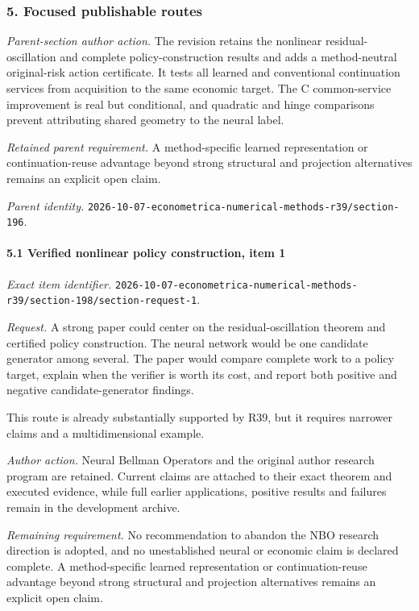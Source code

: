 \subsubsection{5. Focused publishable routes}

\emph{Parent-section author action.} The revision retains the nonlinear residual-oscillation and complete policy-construction results and adds a method-neutral original-risk action certificate. It tests all learned and conventional continuation services from acquisition to the same economic target. The C common-service improvement is real but conditional, and quadratic and hinge comparisons prevent attributing shared geometry to the neural label.

\par\emph{Retained parent requirement.} A method-specific learned representation or continuation-reuse advantage beyond strong structural and projection alternatives remains an explicit open claim.

\par\emph{Parent identity.} \nolinkurl{2026-10-07-econometrica-numerical-methods-r39/section-196}.

\paragraph{5.1 Verified nonlinear policy construction, item 1}

\emph{Exact item identifier.} \nolinkurl{2026-10-07-econometrica-numerical-methods-r39/section-198/section-request-1}.

\par\emph{Request.} A strong paper could center on the residual-oscillation theorem and certified policy construction. The neural network would be one candidate generator among several. The paper would compare complete work to a policy target, explain when the verifier is worth its cost, and report both positive and negative candidate-generator findings.

This route is already substantially supported by R39, but it requires narrower claims and a multidimensional example.

\par\emph{Author action.} Neural Bellman Operators and the original author research program are retained. Current claims are attached to their exact theorem and executed evidence, while full earlier applications, positive results and failures remain in the development archive.

\par\emph{Remaining requirement.} No recommendation to abandon the NBO research direction is adopted, and no unestablished neural or economic claim is declared complete. A method-specific learned representation or continuation-reuse advantage beyond strong structural and projection alternatives remains an explicit open claim.

